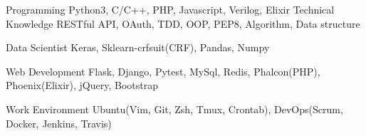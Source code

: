 

\begin{cvskills}

  \cvskill
    {Programming} %
    {Python3, C/C++, PHP, Javascript, Verilog, Elixir} %
  \cvskill
    {Technical Knowledge} %
    {RESTful API, OAuth, TDD, OOP, PEP8, Algorithm, Data structure} %

  \cvskill
    {Data Scientist} %
    {Keras, Sklearn-crfsuit(CRF), Pandas, Numpy} %

  \cvskill
    {Web Development} %
    {Flask, Django, Pytest, MySql, Redis, Phalcon(PHP), Phoenix(Elixir), jQuery, Bootstrap} %

  \cvskill
    {Work Environment} %
    {Ubuntu(Vim, Git, Zsh, Tmux, Crontab), DevOps(Scrum, Docker, Jenkins, Travis)} %

\end{cvskills}
